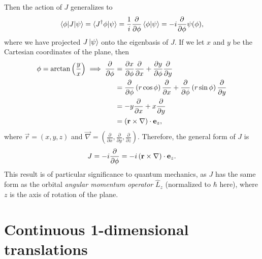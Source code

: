     Then the action of $J$ generalizes to
    \begin{align*}
        \braket{\phi|J|\psi} = \braket{J^\dagger \phi|\psi} = \frac{1}{i}\frac{\partial}{\partial\phi}\braket{\phi|\psi} = -i\frac{\partial}{\partial\phi}\psi(\phi),
    \end{align*}
    where we have projected $J\ket{\psi}$ onto the eigenbasis of $J$. If we let $x$ and $y$ be the Cartesian coordinates of the plane, then
    \begin{align*}
        \phi = \arctan\left(\frac{y}{x}\right) \implies \frac{\partial}{\partial\phi} 
            &= \frac{\partial x}{\partial \phi}\frac{\partial}{\partial x} + \frac{\partial y}{\partial \phi}\frac{\partial}{\partial y} \\
            &= \frac{\partial}{\partial\phi}\left( r\cos\phi \right)\frac{\partial}{\partial x} + \frac{\partial}{\partial\phi}\left( r\sin\phi \right)\frac{\partial}{\partial y} \\
            &= -y\frac{\partial}{\partial x} + x\frac{\partial}{\partial y} \\
            &= (\mathbf{r}\times\mathbf{\nabla})\cdot\mathbf{e}_z,
    \end{align*}
    where $\vec{r} = (x,y,z)$ and $\vec{\nabla} = \left(\frac{\partial}{\partial x},\frac{\partial}{\partial y},\frac{\partial}{\partial z}\right)$. Therefore, the general form of $J$ is
    \begin{align*}
        J = -i \frac{\partial}{\partial\phi} = -i \left( \mathbf{r}\times\mathbf{\nabla} \right)\cdot\mathbf{e}_z.
    \end{align*}
    This result is of particular significance to quantum mechanics, as $J$ has the same form as the orbital \textit{angular momentum operator} $\hat{L}_z$ (normalized to $\hbar$ here), where $z$ is the axis of rotation of the plane\cite{Hall2013}.
    

    \section{Continuous 1-dimensional translations}

